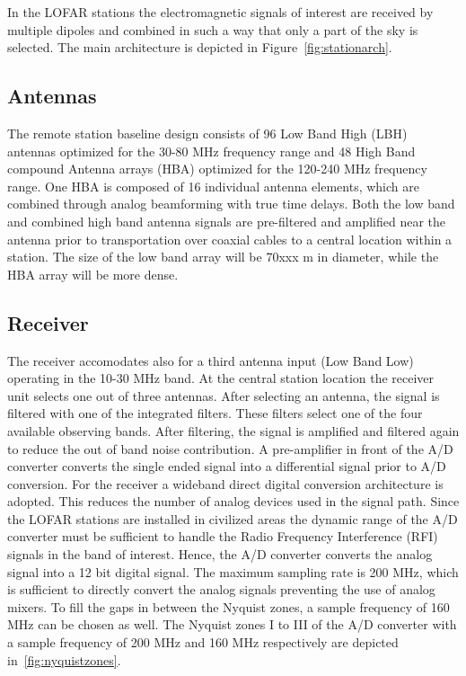 \documentclass[journal]{IEEEtran}
\begin{document}
In the LOFAR stations the electromagnetic signals of interest are received by multiple dipoles and combined in such a way that only a part of the sky is selected. The main architecture is depicted in Figure~\ref{fig:stationarch}. 


\subsection{Antennas}

The remote station baseline design consists of 96 Low Band High (LBH) antennas optimized for the 30-80 MHz frequency range and 48 High Band compound Antenna arrays (HBA) optimized for the 120-240 MHz frequency range. One HBA is composed of 16 individual antenna elements, which are combined through analog beamforming with true time delays. Both the low band and combined high band antenna signals are pre-filtered and amplified near the antenna prior to transportation over coaxial cables to a central location within a station. The size of the low band array will be 70xxx m in diameter, while the HBA array will be more dense. 

\subsection{Receiver}
The receiver accomodates also for a third antenna input (Low Band Low) operating in the 10-30 MHz band. At the central station location the receiver unit selects one out of three antennas. After selecting an antenna, the signal is filtered with one of the integrated filters. These filters select one of the four available observing bands. After filtering, the signal is amplified and filtered again to reduce the out of band noise contribution. A pre-amplifier in front of the A/D converter converts the single ended signal into a differential signal prior to A/D conversion. For the receiver a wideband direct digital conversion architecture is adopted. This reduces the number of analog devices used in the signal path. Since the LOFAR stations are installed in civilized areas the dynamic range of the A/D converter must be sufficient to handle the Radio Frequency Interference (RFI) signals in the band of interest. Hence, the A/D converter converts the analog signal into a 12 bit digital signal. The maximum sampling rate is 200 MHz, which is sufficient to directly convert the analog signals preventing the use of analog mixers. To fill the gaps in between the Nyquist zones, a sample frequency of 160 MHz can be chosen as well. The Nyquist zones I to III of the A/D converter with a sample frequency of 200 MHz and 160 MHz respectively are depicted in~\ref{fig:nyquistzones}. 
\end{document}
